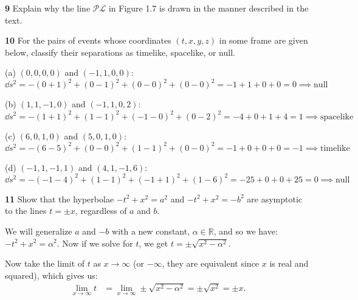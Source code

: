 \documentclass[gr-notes.tex]{subfiles}
\begin{document}
\textbf{9}
Explain why the line $\mathcal{P}\mathcal{L}$ in Figure 1.7 is drawn in the manner described in the text.




\textbf{10}
For the pairs of events whose coordinates $(t,x,y,z)$ in some frame are given below, classify their separations as timelike, spacelike, or null.

(a) $(0,0,0,0)$ and $(-1,1,0,0)$:
\begin{displaymath}
  \dd{s}^2 =
  -(0 + 1)^2 + (0 - 1)^2 + (0 - 0)^2 + (0 - 0)^2 =
  -1 + 1 + 0 + 0 =
  0 \implies
  \mathrm{null}
\end{displaymath}

(b) $(1,1,-1,0)$ and $(-1,1,0,2)$:
\begin{displaymath}
  \dd{s}^2 =
  -(1 + 1)^2 + (1 - 1)^2 + (-1 - 0)^2 + (0 - 2)^2 =
  -4 + 0 + 1 + 4 =
  1 \implies
  \mathrm{spacelike}
\end{displaymath}

(c) $(6,0,1,0)$ and $(5,0,1,0)$:
\begin{displaymath}
  \dd{s}^2 =
  -(6 - 5)^2 + (0 - 0)^2 + (1 - 1)^2 + (0 - 0)^2 =
  -1 + 0 + 0 + 0 =
  -1 \implies
  \mathrm{timelike}
\end{displaymath}

(d) $(-1,1,-1,1)$ and $(4,1,-1,6)$:
\begin{displaymath}
  \dd{s}^2 =
  -(-1 - 4)^2 + (1 - 1)^2 + (-1 + 1)^2 + (1 - 6)^2 =
  -25 + 0 + 0 + 25 =
  0 \implies
  \mathrm{null}
\end{displaymath}


\textbf{11}
Show that the hyperbolae $-t^2 + x^2 = a^2$ and $-t^2 + x^2 = -b^2$ are asymptotic to the lines $t = \pm x$, regardless of $a$ and $b$.

We will generalize $a$ and $-b$ with a new constant, $\alpha \in \mathbb{R}$, and so we have: $-t^2 + x^2 = \alpha^2$. Now if we solve for $t$, we get $t = \pm \sqrt{x^2 - \alpha^2}$.

Now take the limit of $t$ as $x \to \infty$ (or $-\infty$, they are equivalent since $x$ is real and squared), which gives us:
\begin{align*}
  \lim_{x\to\infty} t &=
  \lim_{x\to\infty} \pm \sqrt{x^2 - \alpha^2} =
  \pm \sqrt{x^2} = \pm x.
\end{align*}
\end{document}
